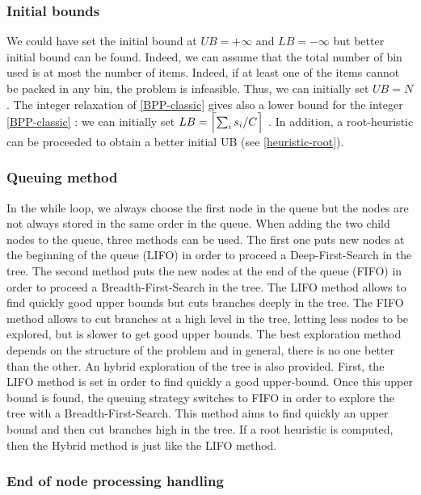 \subsubsection{Initial bounds}

We could have set the initial bound at $UB = + \infty$ and $LB = -\infty$ but better initial bound can be found. Indeed, we can assume that the total number of bin used is at most the number of items. Indeed, if at least one of the items cannot be packed in any bin, the problem is infeasible. Thus, we can initially set $UB = N$. The integer relaxation of \eqref{BPP-classic} gives also a lower bound for the integer \eqref{BPP-classic} : we can initially set $LB = \ceil[\Big]{\sum_i s_i/C}$ \cite{sadykov2013bin}. In addition, a root-heuristic can be proceeded to obtain a better initial UB (see \ref{heuristic-root}).

\subsubsection{Queuing method}

In the while loop, we always choose the first node in the queue but the nodes are not always  stored in the same order in the queue. When adding the two child nodes to the queue, three methods can be used. The first one puts new nodes at the beginning of the queue (LIFO) in order to proceed a Deep-First-Search in the tree. The second method puts the new nodes at the end of the queue (FIFO) in order to proceed a Breadth-First-Search in the tree. The LIFO method allows to find quickly good upper bounds but cuts branches deeply in the tree. The FIFO method allows to cut branches at a high level in the tree, letting less nodes to be explored, but is slower to get good upper bounds. The best exploration method depends on the structure of the problem and in general, there is no one better than the other. An hybrid exploration of the tree is also provided. First, the LIFO method is set in order to find quickly a good upper-bound. Once this upper bound is found, the queuing strategy switches to FIFO in order to explore the tree with a Breadth-First-Search. This method aims to find quickly an upper bound and then cut branches high in the tree. If a root heuristic is computed, then the Hybrid method is just like the LIFO method.

\subsubsection{End of node processing handling}

